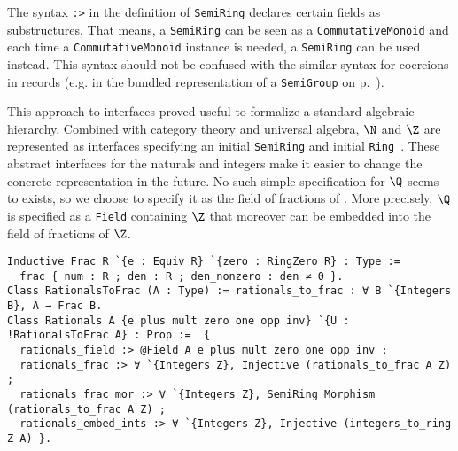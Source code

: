 \documentclass[a4paper,10pt,runningheads]{llncs}
\begin{document}
The syntax \lstinline|:>| in the definition of \lstinline|SemiRing| declares certain fields as substructures. That means, a \lstinline|SemiRing| can be seen as a \lstinline|CommutativeMonoid| and each time a \lstinline|CommutativeMonoid| instance is needed, a \lstinline|SemiRing| can be used instead. This syntax should not be confused with the similar syntax for coercions in records (e.g. in the bundled representation of a \lstinline|SemiGroup| on p.~\pageref{lstlisting:semigroup_bundled}).

This approach to interfaces proved useful to formalize a standard algebraic hierarchy. Combined with category theory and universal algebra, $\N$ and $\Z$ are represented as interfaces specifying an initial \lstinline|SemiRing| and initial \lstinline|Ring|~\cite{math-classes}. These abstract interfaces for the naturals and integers make it easier to change the concrete representation in the future.
No such simple specification for $\Q$ seems to exists, so we choose to specify it as the field of fractions of \Z. More precisely, $\Q$ is specified as a \lstinline|Field| containing $\Z$ that moreover can be embedded into the field of fractions of $\Z$.
\begin{lstlisting}
Inductive Frac R `{e : Equiv R} `{zero : RingZero R} : Type := 
  frac { num : R ; den : R ; den_nonzero : den ≠ 0 }.
Class RationalsToFrac (A : Type) := rationals_to_frac : ∀ B `{Integers B}, A → Frac B.
Class Rationals A {e plus mult zero one opp inv} `{U : !RationalsToFrac A} : Prop :=  { 
  rationals_field :> @Field A e plus mult zero one opp inv ; 
  rationals_frac :> ∀ `{Integers Z}, Injective (rationals_to_frac A Z) ; 
  rationals_frac_mor :> ∀ `{Integers Z}, SemiRing_Morphism (rationals_to_frac A Z) ; 
  rationals_embed_ints :> ∀ `{Integers Z}, Injective (integers_to_ring Z A) }.
\end{lstlisting}
\vspace*{-3mm}
\end{document}
